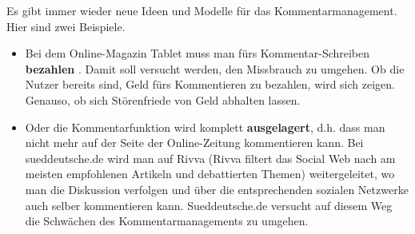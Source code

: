 Es gibt immer wieder neue Ideen und Modelle für das Kommentarmanagement. Hier sind zwei Beispiele.
\begin{itemize}
	\item Bei dem Online-Magazin \glqq Tablet\grqq{} muss man fürs Kommentar-Schreiben {\bfseries bezahlen}
	\autocite{schenz}.
Damit soll versucht werden, den Missbrauch zu umgehen. Ob die Nutzer bereits sind, Geld fürs Kommentieren zu bezahlen, wird sich zeigen. Genauso, ob sich Störenfriede von Geld abhalten lassen.


\item Oder die Kommentarfunktion wird komplett {\bfseries ausgelagert}, d.h. dass man nicht mehr auf der Seite der
	Online-Zeitung kommentieren kann. Bei sueddeutsche.de wird man auf \glqq Rivva\grqq{} (Rivva filtert das Social Web nach am meisten empfohlenen Artikeln und debattierten Themen) weitergeleitet, wo man die Diskussion verfolgen und über die entsprechenden sozialen Netzwerke auch selber kommentieren kann. Sueddeutsche.de versucht auf diesem Weg die Schwächen des Kommentarmanagements zu umgehen. 

\end{itemize}


